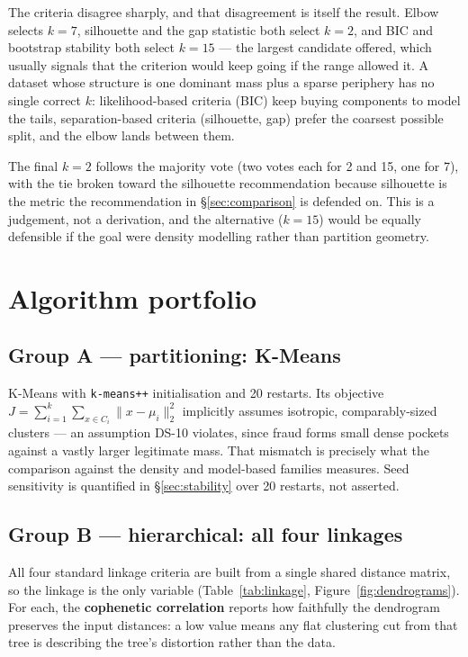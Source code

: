\documentclass[11pt, a4paper]{article}
\begin{document}
The criteria disagree sharply, and that disagreement is itself the result. Elbow
selects $k=7$, silhouette and the gap statistic both select $k=2$, and BIC and
bootstrap stability both select $k=15$ --- the largest candidate offered, which
usually signals that the criterion would keep going if the range allowed it. A
dataset whose structure is one dominant mass plus a sparse periphery has no
single correct $k$: likelihood-based criteria (BIC) keep buying components to
model the tails, separation-based criteria (silhouette, gap) prefer the coarsest
possible split, and the elbow lands between them.

The final $k=2$ follows the majority vote (two votes each for 2 and 15, one for
7), with the tie broken toward the silhouette recommendation because silhouette
is the metric the recommendation in \S\ref{sec:comparison} is defended on. This
is a judgement, not a derivation, and the alternative ($k=15$) would be equally
defensible if the goal were density modelling rather than partition geometry.

\section{Algorithm portfolio}
\label{sec:portfolio}

\subsection{Group A --- partitioning: K-Means}
K-Means with \texttt{k-means++} initialisation and 20 restarts. Its objective
$J = \sum_{i=1}^{k}\sum_{x \in C_i} \lVert x - \mu_i \rVert_2^2$ implicitly
assumes isotropic, comparably-sized clusters --- an assumption DS-10 violates,
since fraud forms small dense pockets against a vastly larger legitimate mass.
That mismatch is precisely what the comparison against the density and
model-based families measures. Seed sensitivity is quantified in
\S\ref{sec:stability} over 20 restarts, not asserted.

\subsection{Group B --- hierarchical: all four linkages}
All four standard linkage criteria are built from a single shared distance
matrix, so the linkage is the only variable (Table~\ref{tab:linkage},
Figure~\ref{fig:dendrograms}). For each, the \textbf{cophenetic correlation}
reports how faithfully the dendrogram preserves the input distances: a low value
means any flat clustering cut from that tree is describing the tree's
distortion rather than the data.
\end{document}
